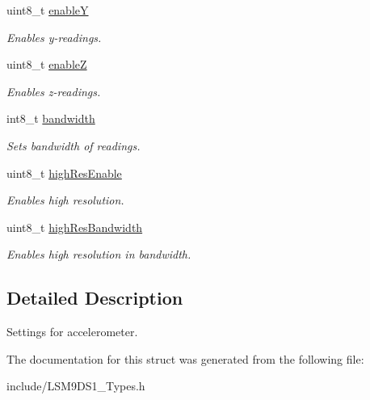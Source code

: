 \begin{DoxyCompactItemize}
\mbox{\label{structaccelSettings_a3f9ff5abfde83c5a59808faeb5ad4c6c}} 
uint8\+\_\+t \hyperlink{structaccelSettings_a3f9ff5abfde83c5a59808faeb5ad4c6c}{enableY}
\begin{DoxyCompactList}\small\item\em Enables y-\/readings. \end{DoxyCompactList}\item 
\mbox{\label{structaccelSettings_abdb5ee5fb9a802315d8340ea5d83b587}} 
uint8\+\_\+t \hyperlink{structaccelSettings_abdb5ee5fb9a802315d8340ea5d83b587}{enableZ}
\begin{DoxyCompactList}\small\item\em Enables z-\/readings. \end{DoxyCompactList}\item 
\mbox{\label{structaccelSettings_ab64c80f62ecfeb3041744febaed9407b}} 
int8\+\_\+t \hyperlink{structaccelSettings_ab64c80f62ecfeb3041744febaed9407b}{bandwidth}
\begin{DoxyCompactList}\small\item\em Sets bandwidth of readings. \end{DoxyCompactList}\item 
\mbox{\label{structaccelSettings_ad165444ae7996ff6160be01d77d33b62}} 
uint8\+\_\+t \hyperlink{structaccelSettings_ad165444ae7996ff6160be01d77d33b62}{high\+Res\+Enable}
\begin{DoxyCompactList}\small\item\em Enables high resolution. \end{DoxyCompactList}\item 
\mbox{\label{structaccelSettings_a3925a8342b5a4b3caecd187e729954f3}} 
uint8\+\_\+t \hyperlink{structaccelSettings_a3925a8342b5a4b3caecd187e729954f3}{high\+Res\+Bandwidth}
\begin{DoxyCompactList}\small\item\em Enables high resolution in bandwidth. \end{DoxyCompactList}\end{DoxyCompactItemize}


\subsection{Detailed Description}
Settings for accelerometer. 

The documentation for this struct was generated from the following file\+:\begin{DoxyCompactItemize}
\item 
include/L\+S\+M9\+D\+S1\+\_\+\+Types.\+h\end{DoxyCompactItemize}
